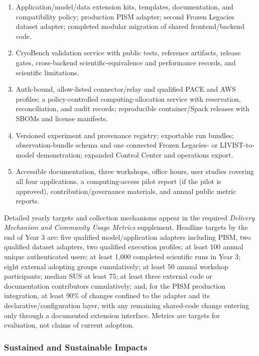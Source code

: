 \begin{enumerate}[leftmargin=*]
  \item Application/model/data extension kits, templates, documentation, and
  compatibility policy; production PISM adapter; second Frozen Legacies
  dataset adapter; completed modular migration of shared frontend/backend code.
  \item CryoBench validation service with public tests, reference artifacts,
  release gates, cross-backend scientific-equivalence and performance records,
  and scientific limitations.
  \item Auth-bound, allow-listed connector/relay and qualified PACE and AWS
  profiles; a policy-controlled computing-allocation service with
  reservation, reconciliation, and audit records; reproducible container/Spack
  releases with SBOMs and license manifests.
  \item Versioned experiment and provenance registry; exportable run bundles;
  observation-bundle schema and one connected Frozen Legacies- or
  LIVIST-to-model demonstration; expanded Control Center and operations export.
  \item Accessible documentation, three workshops, office hours, user studies
  covering all four applications, a computing-access pilot report (if the pilot
  is approved), contribution/governance materials, and annual public metric
  reports.
\end{enumerate}

Detailed yearly targets and collection mechanisms appear in the required
\textit{Delivery Mechanism and Community Usage Metrics} supplement. Headline
targets by the end of Year 3 are: five qualified model/application adapters
including PISM, two qualified dataset adapters, two qualified execution
profiles; at least 100 annual unique
authenticated users; at least 1,000 completed scientific runs in Year 3; eight
external adopting groups cumulatively; at least 50 annual workshop
participants; median SUS at least 75; at least three external code or
documentation contributors cumulatively; and, for the PISM production
integration, at least 90\% of changes confined to the adapter and its
declarative/configuration layer, with any remaining shared-code change
entering only through a documented extension interface. Metrics are targets
for evaluation, not claims of current adoption.

\subsubsection{Sustained and Sustainable Impacts}

